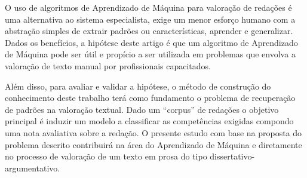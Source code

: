 O uso de algoritmos de Aprendizado de Máquina para valoração de redações é uma
alternativa ao sistema especialista, exige um menor esforço humano com a 
abstração simples de extrair padrões ou características, aprender e generalizar.
Dados os benefícios, a hipótese deste artigo é que um algoritmo de Aprendizado 
de Máquina pode ser útil e propício a ser utilizada em problemas que envolva a 
valoração de texto manual por profissionais capacitados. 

Além disso, para avaliar e validar a hipótese, o método de construção do 
conhecimento deste trabalho terá como fundamento o problema de recuperação de 
padrões na valoração textual. Dado um ``corpus'' de redações o objetivo 
principal é induzir um modelo a classificar as competências exigidas compondo 
uma nota avaliativa sobre a redação. O presente estudo com base na proposta do 
problema descrito contribuirá na área do Aprendizado de Máquina e diretamente 
no processo de valoração de um texto em prosa do tipo 
dissertativo-argumentativo.